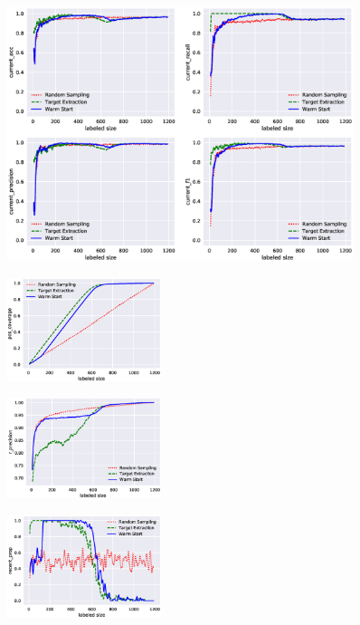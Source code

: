 \documentclass{deime}
\begin{document}
\begin{figure}[!t]
\centering
\includegraphics[width=0.9\textwidth]{resource/text_msg/current_k-fold5}
\label{current1}
\end{figure}

\begin{figure}[!t]
\centering
\includegraphics[width=0.4\textwidth]{resource/text_msg/pos_coverage}
\label{pos_cov1}
\end{figure}

\begin{figure}[!t]
\centering
\includegraphics[width=0.4\textwidth]{resource/text_msg/r_precision}
\label{rprecision1}
\end{figure}

\begin{figure}[!t]
\centering
\includegraphics[width=0.4\textwidth]{resource/text_msg/recent_prop}
\label{recent1}
\end{figure}
\end{document}

